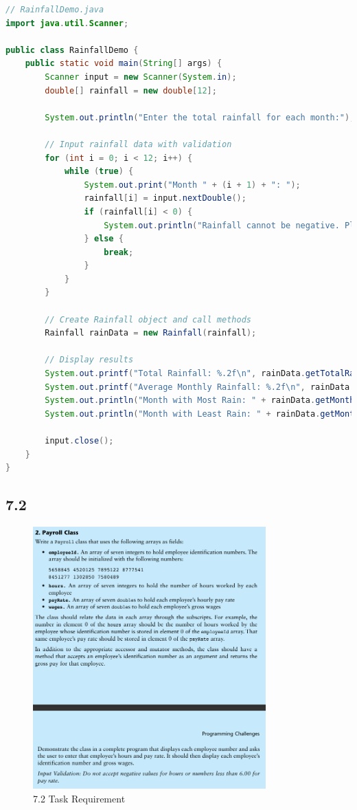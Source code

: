 \documentclass{article}
\begin{document}
\begin{lstlisting}[language=Java, caption=RainFallDemo.java]
// RainfallDemo.java
import java.util.Scanner;

public class RainfallDemo {
    public static void main(String[] args) {
        Scanner input = new Scanner(System.in);
        double[] rainfall = new double[12];

        System.out.println("Enter the total rainfall for each month:");

        // Input rainfall data with validation
        for (int i = 0; i < 12; i++) {
            while (true) {
                System.out.print("Month " + (i + 1) + ": ");
                rainfall[i] = input.nextDouble();
                if (rainfall[i] < 0) {
                    System.out.println("Rainfall cannot be negative. Please enter a valid number.");
                } else {
                    break;
                }
            }
        }

        // Create Rainfall object and call methods
        Rainfall rainData = new Rainfall(rainfall);

        // Display results
        System.out.printf("Total Rainfall: %.2f\n", rainData.getTotalRainfall());
        System.out.printf("Average Monthly Rainfall: %.2f\n", rainData.getAverageRainfall());
        System.out.println("Month with Most Rain: " + rainData.getMonthWithMostRain());
        System.out.println("Month with Least Rain: " + rainData.getMonthWithLeastRain());

        input.close();
    }
}
\end{lstlisting}

\subsection*{7.2}

\begin{figure}[H]
    \centering
    \includegraphics[width=0.8\textwidth]{./Assets/Task requirements/Assignment8/7.2.png}
    \caption{7.2 Task Requirement}
\end{figure}
\end{document}
